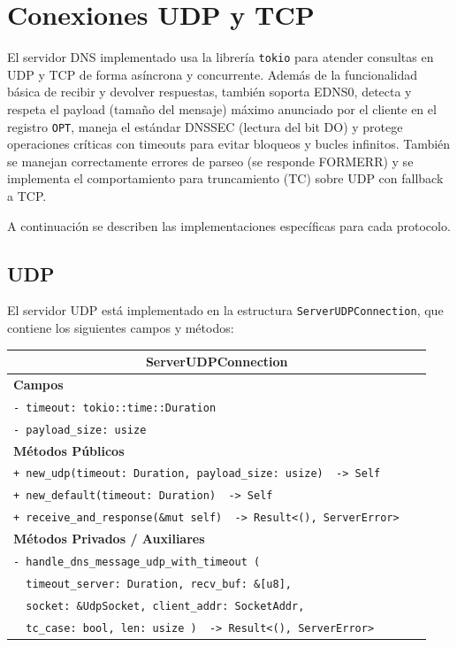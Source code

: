 \chapter{Conexiones UDP y TCP}

El servidor DNS implementado usa la librería \texttt{tokio} para atender consultas en UDP y TCP de forma asíncrona y concurrente. 
Además de la funcionalidad básica de recibir y devolver respuestas, también soporta EDNS0, detecta y respeta el payload (tamaño del mensaje) máximo 
anunciado por el cliente en el registro \texttt{OPT}, maneja el estándar DNSSEC (lectura del bit DO) y protege operaciones críticas
con timeouts para evitar bloqueos y bucles infinitos. También se manejan correctamente errores de parseo (se responde FORMERR) y
se implementa el comportamiento para truncamiento (TC) sobre UDP con fallback a TCP.

A continuación se describen las implementaciones específicas para cada protocolo.

\section{UDP}

El servidor UDP está implementado en la estructura \texttt{ServerUDPConnection}, que contiene los siguientes campos y métodos:

\begin{table}[h!]
\centering
\renewcommand{\arraystretch}{1.1}

\begin{tabular}{|p{0.95\linewidth}|}
\hline
\multicolumn{1}{|c|}{\textbf{ServerUDPConnection}} \\
\hline
\textbf{Campos} \\
\hline
\texttt{- timeout: tokio::time::Duration} \\
\texttt{- payload\_size: usize} \\
\hline
\textbf{Métodos Públicos} \\
\hline
\texttt{+ new\_udp(timeout: Duration, payload\_size: usize)\ \ ->\ Self} \\
\texttt{+ new\_default(timeout: Duration)\ \ ->\ Self} \\
\texttt{+ receive\_and\_response(\&mut self)\ \ ->\ Result<(), ServerError>} \\
\hline
\textbf{Métodos Privados / Auxiliares} \\
\hline
\texttt{- handle\_dns\_message\_udp\_with\_timeout (} \\
\texttt{\ \ timeout\_server: Duration, recv\_buf: \&[u8],} \\
\texttt{\ \ socket: \&UdpSocket, client\_addr: SocketAddr,} \\
\texttt{\ \ tc\_case: bool, len: usize )\ \ ->\ Result<(), ServerError>} \\
\hline
\end{tabular}
\end{table}


